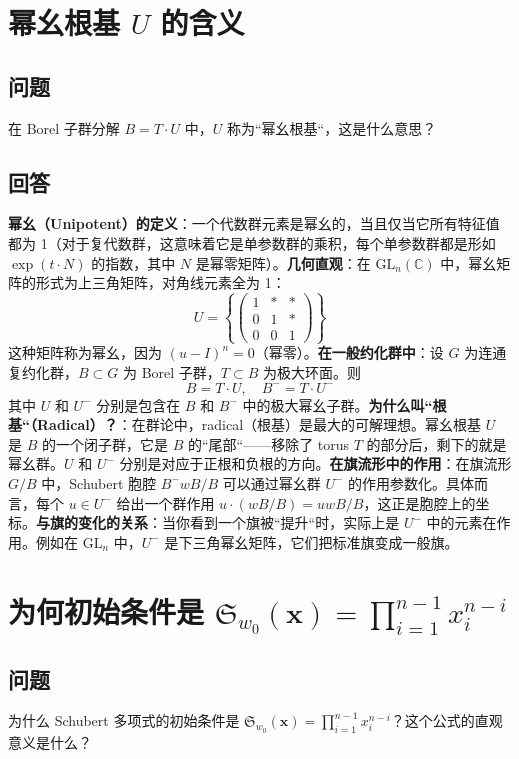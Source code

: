 \section{幂幺根基 $U$ 的含义}\label{sec:unipotent-radical}
\subsection{问题}
在 Borel 子群分解 $B = T \cdot U$ 中，$U$ 称为``幂幺根基``，这是什么意思？
\subsection{回答}
\textbf{幂幺（Unipotent）的定义}：一个代数群元素是幂幺的，当且仅当它所有特征值都为 1（对于复代数群，这意味着它是单参数群的乘积，每个单参数群都是形如 $\exp(t \cdot N)$ 的指数，其中 $N$ 是幂零矩阵）。\textbf{几何直观}：在 $\mathrm{GL}_n(\mathbb{C})$ 中，幂幺矩阵的形式为上三角矩阵，对角线元素全为 1：$$U = \left\{
\begin{pmatrix}1 & * & * \\0 & 1 & * \\0 & 0 & 1
\end{pmatrix}\right\}$$这种矩阵称为幂幺，因为 $(u - I)^n = 0$（幂零）。\textbf{在一般约化群中}：设 $G$ 为连通复约化群，$B \subset G$ 为 Borel 子群，$T \subset B$ 为极大环面。则$$B = T \cdot U, \quad B^- = T \cdot U^-$$其中 $U$ 和 $U^-$ 分别是包含在 $B$ 和 $B^-$ 中的极大幂幺子群。\textbf{为什么叫``根基``（Radical）？}：在群论中，radical（根基）是最大的可解理想。幂幺根基 $U$ 是 $B$ 的一个闭子群，它是 $B$ 的``尾部``——移除了 torus $T$ 的部分后，剩下的就是幂幺群。$U$ 和 $U^-$ 分别是对应于正根和负根的方向。\textbf{在旗流形中的作用}：在旗流形 $G/B$ 中，Schubert 胞腔 $B^-wB/B$ 可以通过幂幺群 $U^-$ 的作用参数化。具体而言，每个 $u \in U^-$ 给出一个群作用 $u \cdot (wB/B) = uwB/B$，这正是胞腔上的坐标。\textbf{与旗的变化的关系}：当你看到一个旗被``提升``时，实际上是 $U^-$ 中的元素在作用。例如在 $\mathrm{GL}_n$ 中，$U^-$ 是下三角幂幺矩阵，它们把标准旗变成一般旗。
\section{为何初始条件是 $\mathfrak{S}_{w_0}(\mathbf{x}) = \prod_{i=1}^{n-1} x_i^{n-i}$}\label{sec:InitialCondition}
\subsection{问题}
为什么 Schubert 多项式的初始条件是 $\mathfrak{S}_{w_0}(\mathbf{x}) = \prod_{i=1}^{n-1} x_i^{n-i}$？这个公式的直观意义是什么？
